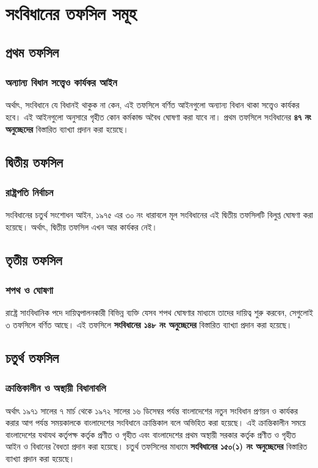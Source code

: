 \documentclass[11pt]{article}
\begin{document}
\section{সংবিধানের তফসিল সমূহ}
\label{sec:org43da6e0}

\subsection{প্রথম তফসিল}
\label{sec:org83f3bf2}
\subsubsection{অন্যান্য বিধান সত্ত্বেও কার্যকর আইন}
\label{sec:org97d3087}
অর্থাৎ, সংবিধানে যে বিধানই থাকুক না কেন,
এই তফসিলে বর্ণিত আইনগুলো  অন্যান্য বিধান থাকা সত্ত্বেও কার্যকর হবে। এই আইনগুলো
অনুসারে গৃহীত কোন কর্মকান্ড অবৈধ ঘোষণা করা যাবে না। প্রথম তফসিলে সংবিধানের
\textbf{৪৭ নং অনুচ্ছেদের} বিস্তারিত ব্যাখ্যা প্রদান করা হয়েছে।

\subsection{দ্বিতীয় তফসিল}
\label{sec:org2347aa7}
\subsubsection{রাষ্ট্রপতি নির্বাচন}
\label{sec:orge4c8984}
সংবিধানের চতুর্থ সংশােধন আইন, ১৯৭৫ এর ৩০ নং ধারাবলে মূল
সংবিধানের এই দ্বিতীয় তফসিলটি বিলুপ্ত ঘোষণা করা হয়েছে। অর্থাৎ, দ্বিতীয় তফসিল
এখন আর কার্যকর নেই।


\subsection{তৃতীয় তফসিল}
\label{sec:orgf5912e4}
\subsubsection{শপথ ও ঘোষণা}
\label{sec:org372db73}
রাষ্ট্রে সাংবিধানিক পদে দায়িত্বপালনকারী বিভিন্ন ব্যক্তি যেসব শপথ ঘোষণার
মাধ্যমে তাদের দায়িত্ব শুরু করবেন, সেগুলোই ৩ তফসিলে বর্ণিত আছে। এই তফসিলে
\textbf{সংবিধানের ১৪৮ নং অনুচ্ছেদের} বিস্তারিত ব্যাখ্যা প্রদান করা হয়েছে।

\subsection{চতুর্থ তফসিল}
\label{sec:org9c63d39}
\subsubsection{ক্রান্তিকালীন ও অস্থায়ী বিধানাবলি}
\label{sec:orge7b85c7}
অর্থাৎ ১৯৭১ সালের ৭ মার্চ থেকে ১৯৭২ সালের ১৬ ডিসেম্বর পর্যন্ত বাংলাদেশের
নতুন সংবিধান প্রণয়ন ও কার্যকর করার আগ পর্যন্ত সময়কালকে বাংলাদেশের সংবিধানে
ক্রান্তিকাল বলে অভিহিত করা হয়েছে। এই ক্রান্তিকালীন সময়ে বাংলাদেশের যথাযথ
কর্তৃপক্ষ কর্তৃক প্রণীত ও গৃহীত এবং বাংলাদেশের প্রথম অস্থায়ী সরকার কর্তৃক প্রণীত ও
গৃহীত আইন ও বিধানের বৈধতা প্রদান করা হয়েছে। চতুর্থ তফসিলের মাধ্যমে
\textbf{সংবিধানের ১৫০(১) নং অনুচ্ছেদের} বিস্তারিত ব্যাখ্যা প্রদান করা হয়েছে।
\end{document}
